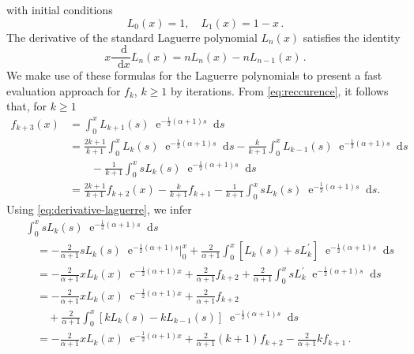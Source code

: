 \documentclass[10pt,a4paper,reqno]{amsart}
\newcommand*\D{\mathop{}\!\mathrm{d}}
\newcommand*\E{\mathop{}\!\mathrm{e}}
\numberwithin{equation}{section}
\theoremstyle{plain}
\theoremstyle{definition}
\theoremstyle{example}
\begin{document}
\noindent with initial conditions
$$
L_0(x) = 1, \quad L_1(x) = 1 - x\,.
$$
The derivative of the standard Laguerre polynomial $L_n(x)$ satisfies the identity
\begin{equation}\label{eq:derivative-laguerre}
x \frac{\D}{\D x} L_n(x) = n L_n(x) - n L_{n-1}(x)\,.
\end{equation}
We make use of these formulas for the Laguerre polynomials to present a fast evaluation approach for $f_k$, $k \geq 1$ by iterations. 
From \eqref{eq:reccurence}, it follows that, for $k\geq 1$
\begin{equation*}
\begin{aligned}
    f_{k+3}(x) &= \int_0^x L_{k+1}(s) \E^{-\frac{1}{2}(\alpha+1) s} \D s \\
    & = \frac{2k+1}{k+1}\int_0^x L_{k}(s)\E^{-\frac{1}{2}(\alpha+1) s}\D s - \frac{k}{k+1}\int_0^x L_{k-1}(s)\E^{-\frac{1}{2}(\alpha+1) s}\D s \\
    &\qquad - \frac{1}{k+1}\int_0^x sL_{k}(s)\E^{-\frac{1}{2}(\alpha+1) s}\D s \\
    & = \frac{2k+1}{k+1}f_{k+2}(x) - \frac{k}{k+1}f_{k+1} - \frac{1}{k+1}\int_0^x sL_{k}(s)\E^{-\frac{1}{2}(\alpha+1) s}\D s.
\end{aligned}   
\end{equation*}
Using \eqref{eq:derivative-laguerre}, we infer
\begin{equation*}
\begin{aligned}
    &\int_0^x sL_{k}(s)\E^{-\frac{1}{2}(\alpha+1) s}\D s \\
    &\quad = -\frac{2}{\alpha+1}sL_{k}(s)\E^{-\frac{1}{2}(\alpha+1) s}|_0^x + \frac{2}{\alpha+1} \int_0^x [L_k(s) + sL_{k}^\prime]\E^{-\frac{1}{2}(\alpha+1) s} \D s\\
    &\quad = -\frac{2}{\alpha+1}xL_{k}(x)\E^{-\frac{1}{2}(\alpha+1)x} + \frac{2}{\alpha+1}f_{k+2} + \frac{2}{\alpha+1} \int_0^x sL_{k}^\prime \E^{-\frac{1}{2}(\alpha+1) s} \D s\\
    &\quad  = -\frac{2}{\alpha+1}xL_{k}(x)\E^{-\frac{1}{2}(\alpha+1)x} + \frac{2}{\alpha+1}f_{k+2}\nonumber\\ 
    &\qquad + \frac{2}{\alpha+1} \int_0^x [ kL_k(s) - kL_{k-1}(s)] \E^{-\frac{1}{2}(\alpha+1) s} \D s \\
    &\quad  = -\frac{2}{\alpha+1}xL_{k}(x)\E^{-\frac{1}{2}(\alpha+1)x} + \frac{2}{\alpha+1}(k+1)f_{k+2} - \frac{2}{\alpha+1}kf_{k+1}\,.
\end{aligned}
\end{equation*}
\end{document}
